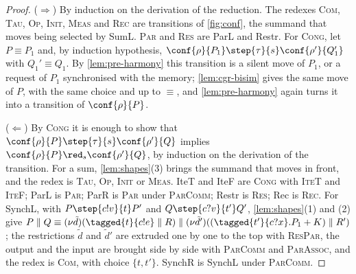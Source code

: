 \begin{proof}
($\Rightarrow$) By induction on the derivation of the reduction. The redexes
\textsc{Com}, \textsc{Tau}, \textsc{Op}, \textsc{Init}, \textsc{Meas} and
\textsc{Rec} are transitions of \cref{fig:conf}, the summand that moves being selected by
SumL. \textsc{Par} and \textsc{Res} are ParL and Restr. For \textsc{Cong}, let
$P \equiv P_1$ and, by induction hypothesis,
$\conf{\rho}{P_1} \step{\tau}{s} \conf{\rho'}{Q_1'}$ with $Q_1' \equiv Q_1$.
By \cref{lem:pre-harmony} this transition is a silent move of $P_1$, or a
request of $P_1$ synchronised with the memory; \cref{lem:cgr-bisim} gives the
same move of $P$, with the same choice and up to $\equiv$, and
\cref{lem:pre-harmony} again turns it into a transition of
$\conf{\rho}{P}$.

($\Leftarrow$) By \textsc{Cong} it is enough to show that
$\conf{\rho}{P} \step{\tau}{s} \conf{\rho'}{Q}$ implies
$\conf{\rho}{P} \red_{s} \conf{\rho'}{Q}$, by induction on the derivation of
the transition. For a sum, \cref{lem:shapes}(3) brings the summand that moves
in front, and the redex is \textsc{Tau}, \textsc{Op}, \textsc{Init} or
\textsc{Meas}. IteT
and IteF are \textsc{Cong} with \textsc{IteT} and \textsc{IteF}; ParL is
\textsc{Par}; ParR is \textsc{Par} under \textsc{ParComm}; Restr is
\textsc{Res}; Rec is \textsc{Rec}. For SynchL, with
$P \step{c!v}{t} P'$ and $Q \step{c?v}{t'} Q'$, \cref{lem:shapes}(1) and (2)
give $P \parallel Q \equiv
(\nu \tilde d)(\tagged{t}{c!e} \parallel R) \parallel
(\nu \tilde d')((\tagged{t'}{c?x}.P_1 + K) \parallel R')$; the restrictions
$\tilde d$ and $\tilde d'$ are extruded one by one to the top with
\textsc{ResPar}, the output and the input are brought side by side with
\textsc{ParComm} and \textsc{ParAssoc}, and the redex is \textsc{Com}, with
choice $\{t,t'\}$. SynchR is SynchL under \textsc{ParComm}.
\end{proof}

